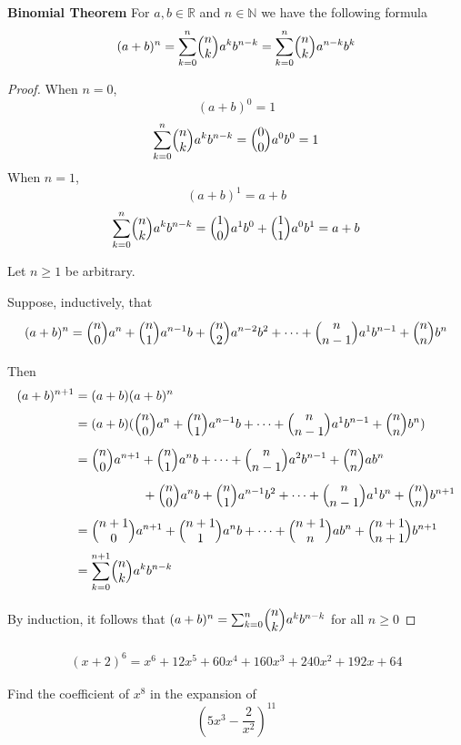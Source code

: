 \begin{thm}
\textbf{Binomial Theorem}
For $a,b\in\mathbb{R}$ and $n\in\mathbb{N}$ we have the following formula
\[
(a+b)^n= \sum_{k=0}^{n} \mybinom{n}{k} a^kb^{n-k} = \sum_{k=0}^{n} \mybinom{n}{k} a^{n-k}b^k
\]
\end{thm}

\begin{proof}
When $n=0$,
\[
(a+b)^0 = 1
\]
\[
\sum_{k=0}^{n} \mybinom{n}{k} a^kb^{n-k} = \mybinom{0}{0} a^0b^0 = 1
\]
When $n=1$,
\[
(a+b)^1 = a+b
\]
\[
\sum_{k=0}^{n} \mybinom{n}{k} a^kb^{n-k} = \mybinom{1}{0} a^1b^0 + \mybinom{1}{1} a^0b^1 = a+b
\]

Let $n\geq 1$ be arbitrary.

Suppose, inductively, that 
\[
(a+b)^n= \mybinom{n}{0} a^n + \mybinom{n}{1} a^{n-1}b + \mybinom{n}{2} a^{n-2}b^2 + \dots  + \mybinom{n}{n-1} a^1b^{n-1} + \mybinom{n}{n} b^n
\]


Then
\begin{align*}
(a+b)^{n+1} & = (a+b)(a+b)^n \\
 & = (a+b) (\mybinom{n}{0} a^n + \mybinom{n}{1} a^{n-1}b + \dots  + \mybinom{n}{n-1} a^1b^{n-1} + \mybinom{n}{n} b^n) \\
 & = \mybinom{n}{0} a^{n+1} + \mybinom{n}{1} a^{n}b + \dots  + \mybinom{n}{n-1} a^2b^{n-1} + \mybinom{n}{n} ab^n  \\
 & \qquad \qquad \quad \ + \mybinom{n}{0} a^nb + \mybinom{n}{1} a^{n-1}b^2 + \dots  + \mybinom{n}{n-1} a^1b^{n} + \mybinom{n}{n} b^{n+1}\\
 & = \mybinom{n+1}{0} a^{n+1} + \mybinom{n+1}{1} a^{n}b + \dots   + \mybinom{n+1}{n} ab^n + \mybinom{n+1}{n+1} b^{n+1}  \\
 & = \sum_{k=0}^{n+1} \mybinom{n}{k} a^kb^{n-k}
\end{align*}

By induction, it follows that $(a+b)^n= \sum_{k=0}^{n} \mybinom{n}{k} a^kb^{n-k}$ for all $n\geq 0$
\end{proof}

\begin{exmp}
\begin{align*}
    (x+2)^6 = x^6+12 x^5+60 x^4+160 x^3+240 x^2+192 x+64
\end{align*}
\end{exmp}

\begin{exmp}
Find the coefficient of $x^8$ in the expansion of 
\[
(5x^3-\frac{2}{x^2})^{11}
\]
\end{exmp}

